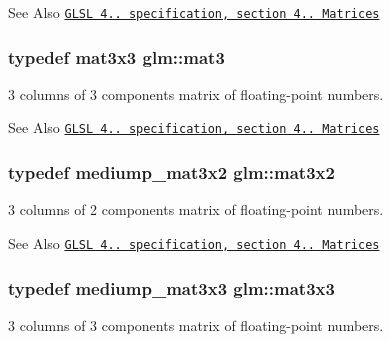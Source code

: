 \begin{DoxySeeAlso}{See Also}
\href{http://www.opengl.org/registry/doc/GLSLangSpec.4.20.8.pdf}{\tt G\-L\-S\-L 4.. specification, section 4.. Matrices} 
\end{DoxySeeAlso}
\hypertarget{group__core__types_gadfaff2a7dce5cbf4e77a47ecea42ac5b}{
\subsubsection[{mat3}]{\setlength{\rightskip}{0pt plus 5cm}typedef mat3x3 {\bf glm\-::mat3}}}\label{group__core__types_gadfaff2a7dce5cbf4e77a47ecea42ac5b}


3 columns of 3 components matrix of floating-\/point numbers. 

\begin{DoxySeeAlso}{See Also}
\href{http://www.opengl.org/registry/doc/GLSLangSpec.4.20.8.pdf}{\tt G\-L\-S\-L 4.. specification, section 4.. Matrices} 
\end{DoxySeeAlso}
\hypertarget{group__core__types_gae38fe62de819d214ac89f1f4df343844}{
\subsubsection[{mat3x2}]{\setlength{\rightskip}{0pt plus 5cm}typedef mediump\-\_\-mat3x2 {\bf glm\-::mat3x2}}}\label{group__core__types_gae38fe62de819d214ac89f1f4df343844}


3 columns of 2 components matrix of floating-\/point numbers. 

\begin{DoxySeeAlso}{See Also}
\href{http://www.opengl.org/registry/doc/GLSLangSpec.4.20.8.pdf}{\tt G\-L\-S\-L 4.. specification, section 4.. Matrices} 
\end{DoxySeeAlso}
\hypertarget{group__core__types_gae01cfe70eb34df727346f82c7c08acd7}{
\subsubsection[{mat3x3}]{\setlength{\rightskip}{0pt plus 5cm}typedef mediump\-\_\-mat3x3 {\bf glm\-::mat3x3}}}\label{group__core__types_gae01cfe70eb34df727346f82c7c08acd7}


3 columns of 3 components matrix of floating-\/point numbers. 

